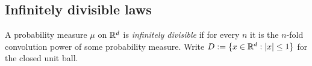 \subsection{Infinitely divisible laws}
\label{subsec:cited-sato}

A probability measure $\mu$ on $\mathbb{R}^d$ is \emph{infinitely divisible} if for every $n$ it is the
$n$-fold convolution power of some probability measure. Write $D := \{x \in \mathbb{R}^d : |x| \le 1\}$
for the closed unit ball.

